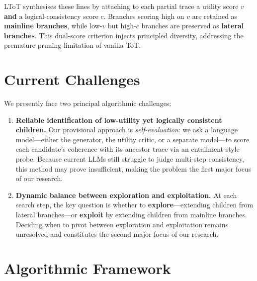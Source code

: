 \documentclass[onecolumn]{IEEEtran}
\begin{document}
LToT synthesises these lines by attaching to each partial trace a utility score $v$ \textbf{and} a logical-consistency score $c$.
Branches scoring high on $v$ are retained as \textbf{mainline branches}, while low-$v$ but high-$c$ branches are preserved as \textbf{lateral branches}.
This dual-score criterion injects principled diversity, addressing the premature-pruning limitation of vanilla ToT.


\section{Current Challenges}
\label{section:current-challenges}

We presently face two principal algorithmic challenges:

\begin{enumerate}
   \item
      \textbf{Reliable identification of low-utility yet logically consistent children.}
      Our provisional approach is \textit{self-evaluation}: we ask a language model—either the generator, the utility critic, or a separate model—to score each candidate's coherence with its ancestor trace via an entailment-style probe.
      Because current LLMs still struggle to judge multi-step consistency, this method may prove insufficient, making the problem the first major focus of our research.
   \item
      \textbf{Dynamic balance between exploration and exploitation.}
      At each search step, the key question is whether to \textbf{explore}---extending children from lateral branches---or \textbf{exploit} by extending children from mainline branches.
      Deciding when to pivot between exploration and exploitation remains unresolved and constitutes the second major focus of our research.
\end{enumerate}


\section{Algorithmic Framework}
\label{section:algorithmic-framework}
\end{document}
